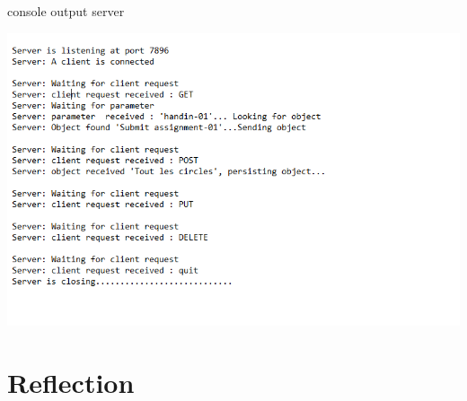 \begin{center}
\centering
\caption{console output server}
\includegraphics[scale=0.7]{images/TCP_run_server.png}
\end{center}
\vspace{10pt}


\section{Reflection}
\label{tcp_reflection}


